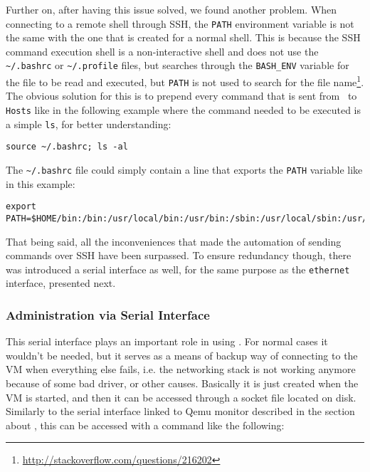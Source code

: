 Further on, after having this issue solved, we found another problem.
When connecting to a remote shell through SSH, the \texttt{PATH} environment variable is not the same with the one that is created for a normal shell.
This is because the SSH command execution shell is a non-interactive shell and does not use the \texttt{\textasciitilde/.bashrc} or \texttt{\textasciitilde/.profile} files, but searches through the \texttt{BASH_ENV} variable for the file to be read and executed, but \texttt{PATH} is not used to search for the file name\footnote{\url{http://stackoverflow.com/questions/216202}}.
The obvious solution for this is to prepend every command that is sent from \project\ to \texttt{Hosts} like in the following example where the command needed to be executed is a simple \texttt{ls}, for better understanding:

\lstset{label=lst:ssh-prepend-example}
\begin{lstlisting}
source ~/.bashrc; ls -al
\end{lstlisting}

The \texttt{\textasciitilde/.bashrc} file could simply contain a line that exports the \texttt{PATH} variable like in this example:

\lstset{label=lst:ssh-bashrc-example}
\begin{lstlisting}
export PATH=$HOME/bin:/bin:/usr/local/bin:/usr/bin:/sbin:/usr/local/sbin:/usr/sbin
\end{lstlisting}

That being said, all the inconveniences that made the automation of sending commands over SSH have been surpassed.
To ensure redundancy though, there was introduced a serial interface as well, for the same purpose as the \texttt{ethernet} interface, presented next.

\subsubsection{Administration via Serial Interface}
\label{sub-sub-sec:admin-serial}

This serial interface plays an important role in using \project.
For normal cases it wouldn't be needed, but it serves as a means of backup way of connecting to the VM when everything else fails, i.e. the networking stack is not working anymore because of some bad driver, or other causes.
Basically it is just created when the VM is started, and then it can be accessed through a socket file located on disk.
Similarly to the serial interface linked to Qemu monitor described in the section about , this can be accessed with a command like the following:

